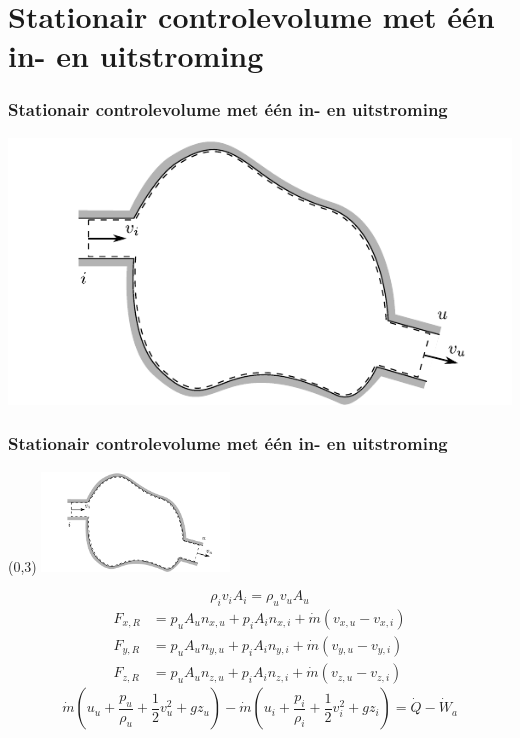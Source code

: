 \documentclass[t]{beamer}
\begin{document}
	\section{Stationair controlevolume met één in- en uitstroming}	
  	\begin{frame}
		\frametitle{Stationair controlevolume met één in- en uitstroming}
		\vspace{1cm}
		\centering
		\includegraphics{fig/controlevolumes/Controlevolume_een_in_en_uitstroming}
	\end{frame}
  	\begin{frame}
		\frametitle{Stationair controlevolume met één in- en uitstroming}
		\begin{textblock}{5}(0,3)
            	\includegraphics[width=5cm]{fig/controlevolumes/Controlevolume_een_in_en_uitstroming}
        	\end{textblock}
        	\vspace{2cm}
		\begin{equation}
			\rho_i v_{i} A_i = \rho_u v_{u} A_u
			\label{eqn:behoud van massa in een stationair controlevolume met een in en uitstroming}
		\end{equation}
		\pause
		\begin{align}
			F_{x,R} &= p_{u} A_u n_{x,u} + p_{i} A_i n_{x,i} + \dot{m} (v_{x,u}-v_{x,i}) \nonumber \\
			F_{y,R} &= p_{u} A_u n_{y,u} + p_{i} A_i n_{y,i} + \dot{m} (v_{y,u}-v_{y,i}) \\
			F_{z,R} &= p_{u} A_u n_{z,u} + p_{i} A_i n_{z,i} + \dot{m} (v_{z,u}-v_{z,i}) \nonumber
			\label{eqn:behoud van impuls in een stationair controlevolume met een in en uitstroming geprojecteerd2}
		\end{align}
		\pause
		\begin{equation}
			\dot{m} (u_u + \frac{p_u}{\rho_u} + \frac{1}{2}v^2_u + g z_u) - \dot{m} (u_i + \frac{p_i}{\rho_i}+ \frac{1}{2}v^2_i + g z_i) = \dot{Q}-\dot{W}_a
			\label{eqn:behoud van energie in een controlevolume met een in en uitstroming asvermogen}
		\end{equation}
	\end{frame}
\end{document}
